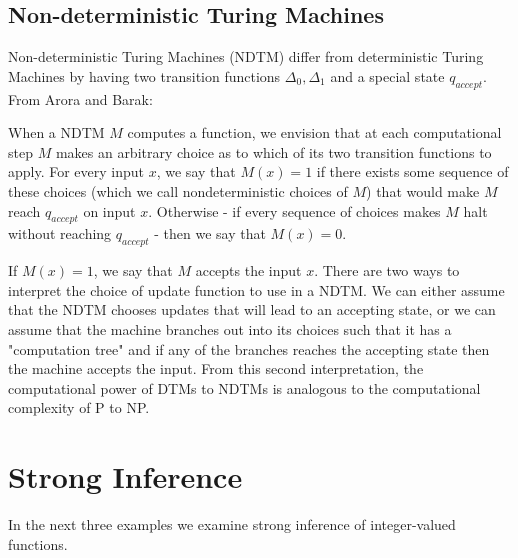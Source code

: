 \documentclass[11pt]{article}
\begin{document}
\subsection{Non-deterministic Turing Machines} 

Non-deterministic Turing Machines (NDTM) differ from deterministic Turing Machines by having two transition functions $ \Delta_0, \Delta_1 $ and a special state $ q_{accept} $. From Arora and Barak:

\begin{displayquote}
When a NDTM $M$ computes a function, we envision that at each computational step $ M $ makes an arbitrary choice as to which of its two transition functions to apply. For every input $ x $, we say that $ M(x) = 1 $ if there exists some sequence of these choices (which we call nondeterministic choices of $ M $) that would make $ M $ reach $ q_{accept} $ on input $ x $. Otherwise - if every sequence of choices makes $ M $ halt without reaching $ q_{accept} $ - then we say that $ M(x) = 0 $. 
\end{displayquote}

If $ M(x) = 1$, we say that $ M $ accepts the input $ x $. There are two ways to interpret the choice of update function to use in a NDTM. We can either assume that the NDTM chooses updates that will lead to an accepting state, or we can assume that the machine branches out into its choices such that it has a "computation tree" and if any of the branches reaches the accepting state then the machine accepts the input. From this second interpretation, the computational power of DTMs to NDTMs is analogous to the computational complexity of P to NP. \\

\section{Strong Inference} 
 
In the next three examples we examine strong inference of integer-valued functions. \\
 
\end{document}
